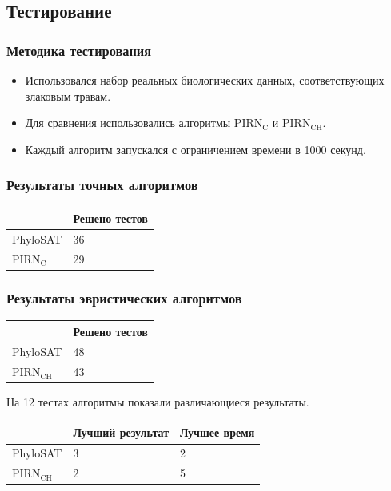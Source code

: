 \documentclass[hyperref={unicode}]{beamer}
\begin{document}
\subsection{Тестирование}

\begin{frame}
\frametitle{Методика тестирования}

\begin{itemize}
	\item Использовался набор реальных биологических данных, соответствующих злаковым травам.
	\item Для сравнения использовались алгоритмы $\mathrm{PIRN_C}$ и $\mathrm{PIRN_{CH}}$.
	\item Каждый алгоритм запускался с ограничением времени в 1000 секунд.
\end{itemize}

\end{frame}

\begin{frame}
\frametitle{Результаты точных алгоритмов}

\begin{table}
\centering
\begin{tabular}{l | l }
	& Решено тестов \\
	\hline
	PhyloSAT & 36 \\
	PIRN$\mathrm{_C}$ & 29 \\
\end{tabular}
\end{table}

\end{frame}

\begin{frame}
\frametitle{Результаты эвристических алгоритмов}

\begin{table}
\begin{tabular}{l | l }
	& Решено тестов \\
	\hline
	PhyloSAT & 48 \\
	PIRN$\mathrm{_{CH}}$ & 43 \\
\end{tabular}
\end{table}

На 12 тестах алгоритмы показали различающиеся результаты.

\begin{table}
\begin{tabular}{l | l | l}
	& Лучший результат & Лучшее время \\
	\hline
	PhyloSAT & 3 & 2 \\
	PIRN$\mathrm{_{CH}}$ & 2 & 5 \\
\end{tabular}
\end{table}

\end{frame}
\end{document}
